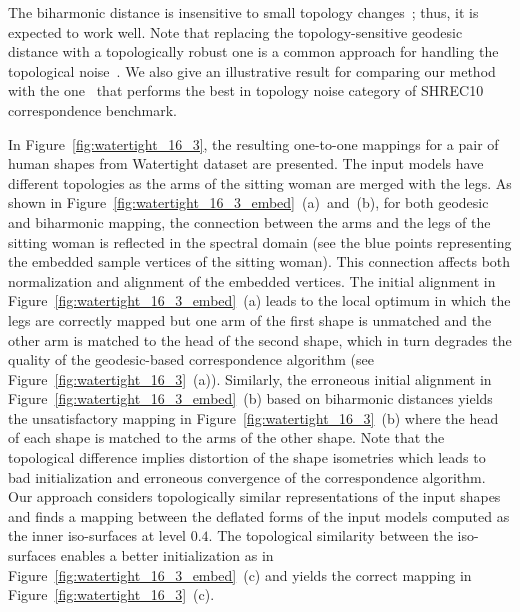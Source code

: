 The biharmonic distance is insensitive to small topology changes~\cite{Lipman10}; thus, it is expected to work well. Note that replacing the topology-sensitive geodesic distance with a topologically robust one is a common approach for handling the topological noise~\cite{Bronstein10, Sharma10, Sharma11}. We also give an illustrative result for comparing our method with the one~\cite{Mateus08} that performs the best in topology noise category of SHREC10 correspondence benchmark.

In Figure~\ref{fig:watertight_16_3}, the resulting one-to-one mappings for a pair of human shapes from Watertight dataset are presented. The input models have different topologies as the arms of the sitting woman are merged with the legs. As shown in Figure~\ref{fig:watertight_16_3_embed}~(a)~and~(b), for both geodesic and biharmonic mapping, the connection between the arms and the legs of the sitting woman is reflected in the spectral domain (see the blue points representing the embedded sample vertices of the sitting woman). This connection affects both normalization and alignment of the embedded vertices. The initial alignment in Figure~\ref{fig:watertight_16_3_embed}~(a) leads to the local optimum in which the legs are correctly mapped but one arm of the first shape is unmatched and the other arm is matched to the head of the second shape, which in turn degrades the quality of the geodesic-based correspondence algorithm (see Figure~\ref{fig:watertight_16_3}~(a)). Similarly, the erroneous initial alignment in Figure~\ref{fig:watertight_16_3_embed}~(b) based on biharmonic distances yields the unsatisfactory mapping in Figure~\ref{fig:watertight_16_3}~(b) where the head of each shape is matched to the arms of the other shape. Note that the topological difference implies distortion of the shape isometries which leads to bad initialization and erroneous convergence of the correspondence algorithm. Our approach considers topologically similar representations of the input shapes and finds a mapping between the deflated forms of the input models computed as the inner iso-surfaces at level $0.4$. The topological similarity between the iso-surfaces enables a better initialization as in Figure~\ref{fig:watertight_16_3_embed}~(c) and yields the correct mapping in Figure~\ref{fig:watertight_16_3}~(c).


